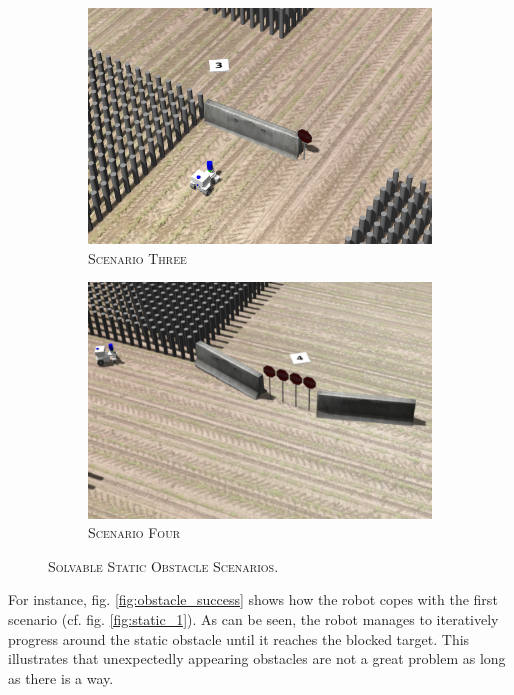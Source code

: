 \documentclass[english, master, utf8]{base/thesis_KBS}
\begin{document}
\begin{figure}[H]
\begin{subfigure}[b]{0.24\textwidth}
        \includegraphics[width=\textwidth]{pics/static_3.png}
        \caption{\textsc{Scenario Three}}
        \label{fig:static_3}
    \end{subfigure}
    \hfill
    \begin{subfigure}[b]{0.24\textwidth}
        \centering
        \includegraphics[width=\textwidth]{pics/static_4.png}
        \caption{\textsc{Scenario Four}}
        \label{fig:static_4}
    \end{subfigure}
\caption{\textsc{Solvable Static Obstacle Scenarios.}}
\label{fig:obstacle_scenarios}
\end{figure}
For instance, fig. \ref{fig:obstacle_success} shows how the robot copes with the first scenario (cf. fig. \ref{fig:static_1}). As can be seen, the robot manages to iteratively
progress around the static obstacle until it reaches the blocked target. This illustrates that unexpectedly appearing obstacles are not a great problem as long as there is a way.
\end{document}
